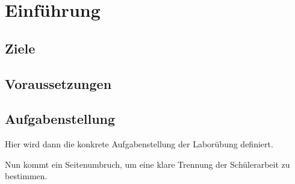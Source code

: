
\section{Einführung}

\subsection{Ziele}



\subsection{Voraussetzungen}


\subsection{Aufgabenstellung}
Hier wird dann die konkrete Aufgabenstellung der Laborübung definiert.

Nun kommt ein Seitenumbruch, um eine klare Trennung der Schülerarbeit zu bestimmen.
\clearpage
